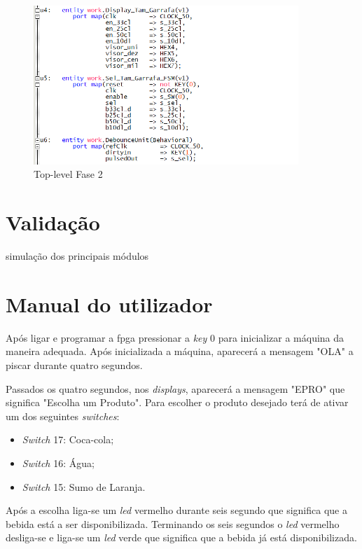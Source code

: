\documentclass{report}
\begin{document}
\begin{figure}[H]
    \centering
    \includegraphics[width = 10cm]{TopLevelF2.png}
    \caption{Top-level Fase 2}
    \label{fig:TL2}
\end{figure}

\chapter{Validação}
\label{chap.validação}
simulação dos principais módulos

\chapter{Manual do utilizador}

Após ligar e programar a \ac{fpga} pressionar a \textit{key} 0 para inicializar a máquina da maneira adequada. Após inicializada a máquina, aparecerá a mensagem "OLA" a piscar durante quatro segundos.

Passados os quatro segundos, nos \textit{displays}, aparecerá a mensagem "EPRO" que significa "Escolha um Produto". Para escolher o produto desejado terá de ativar um dos seguintes \textit{switches}:

\begin{itemize}

\item \textit{Switch} 17: Coca-cola;
\item \textit{Switch} 16: Água;
\item \textit{Switch} 15: Sumo de Laranja.

\end{itemize}

Após a escolha liga-se um \textit{led} vermelho durante seis segundo que significa que a bebida está a ser disponibilizada. Terminando os seis segundos o \textit{led} vermelho desliga-se e liga-se um \textit{led} verde que significa que a bebida já está disponibilizada.
\end{document}
